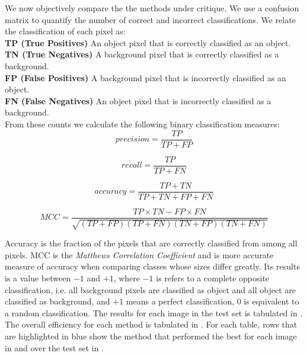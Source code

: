 \begin{definition}
	We now objectively compare the the methods under critique. We use a confusion matrix to quantify the number of correct and incorrect classifications. We relate the classification of each pixel as:\\
	\textbf{TP (True Positives)} An object pixel that is correctly classified as an object.\\
	\textbf{TN (True Negatives)} A background pixel that is correctly classified as a background.\\
	\textbf{FP (False Positives)} A background pixel that is incorrectly classified as an object.\\
	\textbf{FN (False Negatives)} An object pixel that is incorrectly classified as a background.\\

	From these counts we calculate the following binary classification measures:
	\begin{equation*}
		precision = \frac{TP}{TP+FP}
	\end{equation*}
	
	\begin{equation*}
		recall = \frac{TP}{TP+FN}
	\end{equation*}
	
	\begin{equation*}
		accuracy = \frac{TP+TN}{TP+TN+FP+FN}
	\end{equation*}
	
	\begin{equation*}
		MCC = \frac{TP \times TN - FP \times FN}{\sqrt{\left( TP + FP \right) \left( TP + FN \right) \left( TN + FP \right) \left( TN + FN \right)}}
	\end{equation*}
\end{definition}

Accuracy is the fraction of the pixels that are correctly classified from among all pixels. MCC is the \textit{Matthews Correlation Coefficient} and is more accurate measure of accuracy when comparing classes whose sizes differ greatly. Its results is a value between $-1$ and $+1$, where $-1$ is refers to a complete opposite classification, i.e. all background pixels are classified as object and all object are classified as background, and $+1$ means a perfect classification, $0$ is equivalent to a random classification. The results for each image in the test set is tabulated in . The overall efficiency for each method is tabulated in . For each table, rows that are highlighted in blue show the method that performed the best for each image in  and over the test set in .

